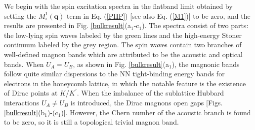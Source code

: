 \documentclass[amsmath,superscriptaddress,showpacs,aps,prl,twocolumn]{revtex4-1}
\begin{document}
\par We begin with the spin excitation spectra in the flatband limit obtained by setting the $M_i^1(\mathbf{q})$ term in Eq. (\ref{PHP}) [see also Eq. (\ref{M1})] to be zero, and the results are presented in Fig. \ref{bulkresult}(a$_1$-c$_1$). The spectra consist of two parts: the low-lying spin waves labeled by the green lines and the high-energy Stoner continuum labeled by the grey region. The spin waves contain two branches of well-defined magnon bands which are attributed to be the acoustic and optical bands. When $U_A=U_B$, as shown in Fig. \ref{bulkresult}(a$_1$), the magnonic bands follow quite similar dispersions to the NN tight-binding energy bands for electrons in the honeycomb lattice, in which the notable feature is the existence of Dirac points at $K$/$K^\prime$. When the imbalance of the sublattice Hubbard interactions $U_A \ne U_B$ is introduced, the Dirac magnons open gaps [Figs. \ref{bulkresult}(b$_1$)-(c$_1$)]. However, the Chern number of the acoustic branch is found to be zero, so it is still a topological trivial magnon band.
\end{document}
